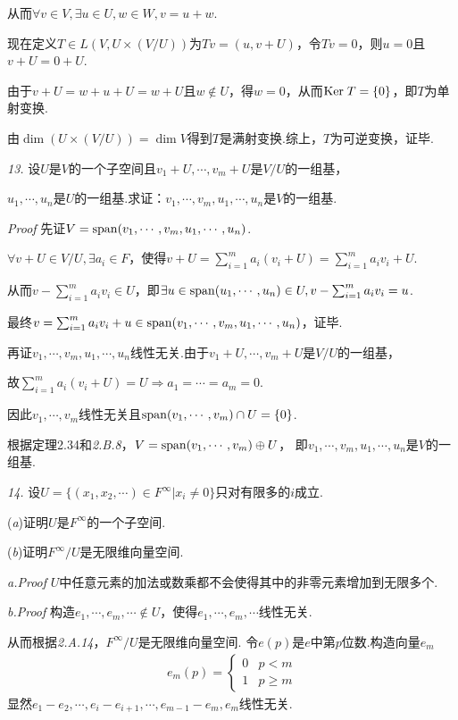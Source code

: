 从而\(\forall v \in V, \exists u \in U,w \in W,v=u+w\).

现在定义\(T \in L(V,U \times (V/U))\)为\(Tv=(u,v+U)\)，令\(Tv=0\)，则\(u=0\)且\(v+U=0+U\).

由于\(v+U=w+u+U=w+U\)且\(w \notin U\)，得\(w=0\)，从而\(\mathrm{Ker \;} T=\{0\}\)，即\(T\)为单射变换.

由\(\dim (U \times (V/U))=\dim V\)得到\(T\)是满射变换.综上，\(T\)为可逆变换，证毕.

\newpage

\textit{13.}
设\(U\)是\(V\)的一个子空间且\(v_1+U,\cdots,v_m+U\)是\(V/U\)的一组基，

\(u_1,\cdots,u_n\)是\(U\)的一组基.求证：\(v_1,\cdots,v_m,u_1,\cdots,u_n\)是\(V\)的一组基.

\textit{Proof}
先证\(V=\mathrm{span} (v_1,\cdots,v_m,u_1,\cdots,u_n)\).

\(\forall v+U \in V/U, \exists a_i \in F\)，使得\(v+U=\sum_{i=1}^m a_i(v_i+U)=\sum_{i=1}^m a_iv_i+U\).

从而\(v-\sum_{i=1}^m a_iv_i \in U\)，即\(\exists u \in \mathrm{span} (u_1,\cdots,u_n) \in U,v-\sum_{i=1}^m a_iv_i=u\).

最终\(v=\sum_{i=1}^m a_iv_i+u \in \mathrm{span} (v_1,\cdots,v_m,u_1,\cdots,u_n)\)，证毕.

再证\(v_1,\cdots,v_m,u_1,\cdots,u_n\)线性无关.由于\(v_1+U,\cdots,v_m+U\)是\(V/U\)的一组基，

故\(\sum_{i=1}^m a_i(v_i+U)=U \Rightarrow a_1=\cdots=a_m=0\).

因此\(v_1,\cdots,v_m\)线性无关且\(\mathrm{span} (v_1,\cdots,v_m) \cap U=\{0\}\).

根据定理2.34和\textit{2.B.8}，\(V=\mathrm{span} (v_1,\cdots,v_m) \oplus U\)，
即\(v_1,\cdots,v_m,u_1,\cdots,u_n\)是\(V\)的一组基.

\hspace*{\fill}

\textit{14.}
设\(U=\{(x_1,x_2,\cdots)\in F^\infty | x_i \ne 0\}\)只对有限多的\(i\)成立.

(\textit{a})证明\(U\)是\(F^\infty\)的一个子空间.

(\textit{b})证明\(F^\infty /U\)是无限维向量空间.

\textit{a.Proof}
\(U\)中任意元素的加法或数乘都不会使得其中的非零元素增加到无限多个.

\textit{b.Proof}
构造\(e_1,\cdots,e_m,\cdots \notin U\)，使得\(e_1,\cdots,e_m,\cdots\)线性无关.

从而根据\textit{2.A.14}，\(F^\infty /U\)是无限维向量空间.
令\(e(p)\)是\(e\)中第\(p\)位数.构造向量\(e_m\)
    \begin{align*}
        e_m(p)=
            \begin{cases}
                0 & p<m \\
                1 & p \geq m
            \end{cases}
    \end{align*}
显然\(e_1-e_2,\cdots,e_i-e_{i+1},\cdots,e_{m-1}-e_m,e_m\)线性无关.

